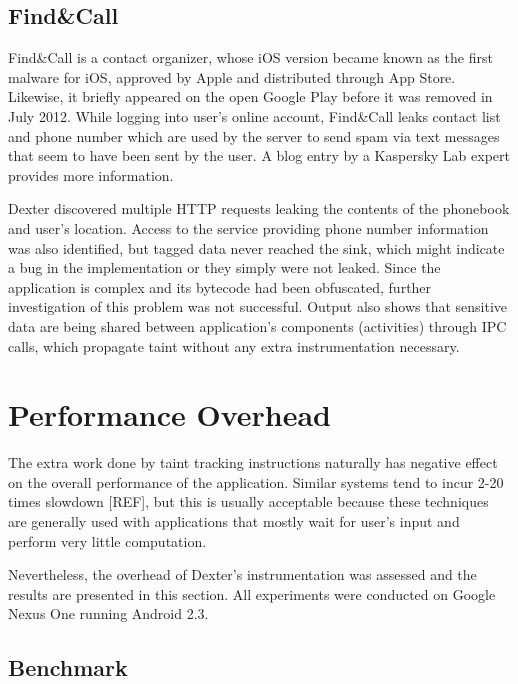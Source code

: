\documentclass[12pt,twoside,notitlepage]{report}
\begin{document}
\subsection{Find\&Call}

Find\&Call is a contact organizer, whose iOS version became known as the first malware for iOS, approved by Apple and distributed through App Store. Likewise, it briefly appeared on the open Google Play before it was removed in July 2012. While logging into user's online account, Find\&Call leaks contact list and phone number which are used by the server to send spam via text messages that seem to have been sent by the user. A blog entry\cite{report:FindAndCall} by a Kaspersky Lab expert provides more information.

Dexter discovered multiple HTTP requests leaking the contents of the phonebook and user's location. Access to the service providing phone number information was also identified, but tagged data never reached the sink, which might indicate a bug in the implementation or they simply were not leaked. Since the application is complex and its bytecode had been obfuscated, further investigation of this problem was not successful. Output also shows that sensitive data are being shared between application's components (activities) through IPC calls, which propagate taint without any extra instrumentation necessary.

\section{Performance Overhead}

The extra work done by taint tracking instructions naturally has negative effect on the overall performance of the application. Similar systems tend to incur 2-20 times slowdown {[}REF], but this is usually acceptable because these techniques are generally used with applications that mostly wait for user's input and perform very little computation. 

Nevertheless, the overhead of Dexter's instrumentation was assessed and the results are presented in this section. All experiments were conducted on Google Nexus One running Android 2.3. 

\subsection{Benchmark}
\end{document}
